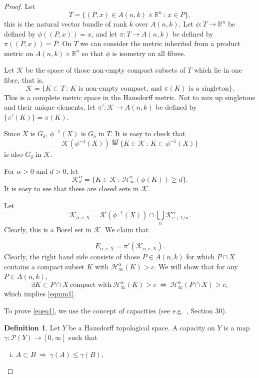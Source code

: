 \documentclass[a4paper]{amsart}
\theoremstyle{definition} \newtheorem{remark}[theorem]{Remark}
\newtheorem*{defin*}{Definition}
\def\R{{\mathbb R}}
\def\iK{{\mathcal{K}}}
\def\su{\subset}
\def\al{\alpha}
\def\ga{\gamma}
\def\hau{\mathcal{H}}
\begin{document}
\begin{proof}
Let 
$$T=\{(P, x) \in A(n,k) \times \R^n \,:\, x\in P\},$$
this is the natural vector bundle of rank $k$ over $A(n,k)$. 
Let $\phi:T\to \R^n$ be defined by $\phi((P,x))=x$, and let $\pi:T\to A(n,k)$ be defined by $\pi((P,x))=P$. 
On $T$ we can consider the metric inherited from a product metric on $A(n,k)\times \R^n$ so that $\phi$ is isometry on all fibres.

Let $\iK$ be the space of those non-empty compact subsets of $T$ which lie in one fibre, that is,
$$\iK=\{K\subset T \,:\,K \text{ is non-empty compact, and }\pi(K)\text{ is a singleton}\}.$$
This is a complete metric space in the Hausdorff metric. 
Not to mix up singletons and their unique elements, let $\pi':\iK\to A(n,k)$ be defined by $\{\pi'(K)\}=\pi(K)$.

Since $X$ is $G_\delta$, $\phi^{-1}(X)$ is $G_\delta$ in $T$. It is easy to check that
$$\iK(\phi^{-1}(X)) \stackrel{\text{def}}{=} \{ K\in \iK \,:\,K\subset \phi^{-1}(X)\}$$
is also $G_\delta$ in $\iK$.

For $\al>0$ and $d > 0$, let
$$\iK^\alpha_d = \{ K \in \iK \,:\,\hau^\alpha_\infty(\phi(K))\ge d\}.$$
It is easy to see that these are closed sets in $\iK$.

Let
$$\iK_{\alpha, c, X} = \iK(\phi^{-1}(X)) \cap \bigcup_n \iK^\alpha_{c+1/n}.$$
Clearly, this is a Borel set in $\iK$. We claim that 

\begin{equation}
E_{\alpha, c, X}= \pi'(\iK_{\alpha, c, X}).
\label{eqmm1}
\end{equation}
Clearly, the right hand side consists of those $P\in A(n,k)$ for which $P\cap X$ contains a compact subset $K$ with $\hau^\alpha_\infty(K) > c$. 
We will show that for any $P \in A(n,k)$, 
\begin{equation}
\label{eqeq1}
\exists K \su P\cap X \ \text{compact with} \ \hau^\alpha_\infty(K) > c \ \Longleftrightarrow \ \hau^\alpha_\infty(P\cap X)>c,
\end{equation}
which implies \eqref{eqmm1}.

To prove \eqref{eqeq1}, we use the concept of capacities (see e.g.~\cite{Kec}, Section 30). 
\begin{defin*}
Let $Y$ be a Hausdorff topological space. A capacity on $Y$ is a map $\ga: \mathcal{P}(Y) \to [0,\infty]$ such that 
\begin{enumerate}[(i)]
	\item \label{one}
	$A \su B \ \Longrightarrow \ \ga(A) \leq \ga(B)$,
	

\end{enumerate}
\end{defin*}
\end{proof}
\end{document}
